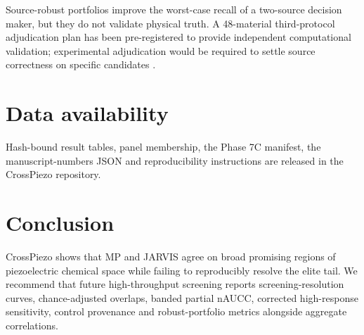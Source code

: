 \documentclass[11pt]{article}
\begin{document}
Source-robust portfolios improve the worst-case recall of a two-source decision maker, but they do not validate physical truth.
A 48-material third-protocol adjudication plan has been pre-registered to provide independent computational validation; experimental adjudication would be required to settle source correctness on specific candidates \cite{wilkinson2016,lyngby2024}.

\section{Data availability}
Hash-bound result tables, panel membership, the Phase 7C manifest, the manuscript-numbers JSON and reproducibility instructions are released in the CrossPiezo repository.

\section{Conclusion}
CrossPiezo shows that MP and JARVIS agree on broad promising regions of piezoelectric chemical space while failing to reproducibly resolve the elite tail.
We recommend that future high-throughput screening reports screening-resolution curves, chance-adjusted overlaps, banded partial nAUCC, corrected high-response sensitivity, control provenance and robust-portfolio metrics alongside aggregate correlations.



\end{document}

